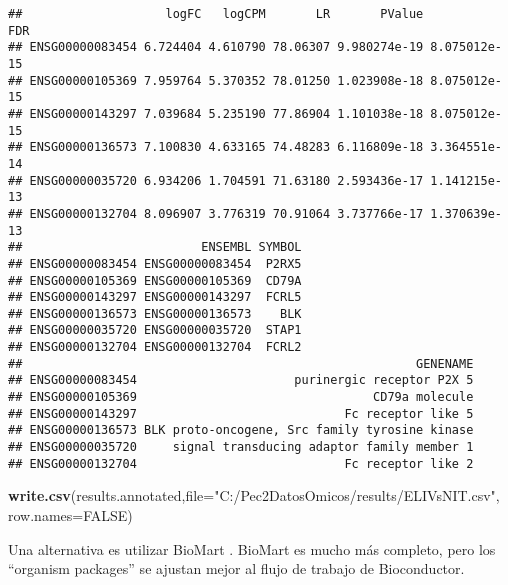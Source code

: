 \documentclass[
]{article}
\newenvironment{Shaded}{\begin{snugshade}}{\end{snugshade}}
\newcommand{\CommentTok}[1]{\textcolor[rgb]{0.56,0.35,0.01}{\textit{#1}}}
\newcommand{\DataTypeTok}[1]{\textcolor[rgb]{0.13,0.29,0.53}{#1}}
\newcommand{\KeywordTok}[1]{\textcolor[rgb]{0.13,0.29,0.53}{\textbf{#1}}}
\newcommand{\NormalTok}[1]{#1}
\newcommand{\OperatorTok}[1]{\textcolor[rgb]{0.81,0.36,0.00}{\textbf{#1}}}
\newcommand{\OtherTok}[1]{\textcolor[rgb]{0.56,0.35,0.01}{#1}}
\newcommand{\StringTok}[1]{\textcolor[rgb]{0.31,0.60,0.02}{#1}}
\begin{document}
\begin{Shaded}
\end{Shaded}

\begin{verbatim}
##                    logFC   logCPM       LR       PValue          FDR
## ENSG00000083454 6.724404 4.610790 78.06307 9.980274e-19 8.075012e-15
## ENSG00000105369 7.959764 5.370352 78.01250 1.023908e-18 8.075012e-15
## ENSG00000143297 7.039684 5.235190 77.86904 1.101038e-18 8.075012e-15
## ENSG00000136573 7.100830 4.633165 74.48283 6.116809e-18 3.364551e-14
## ENSG00000035720 6.934206 1.704591 71.63180 2.593436e-17 1.141215e-13
## ENSG00000132704 8.096907 3.776319 70.91064 3.737766e-17 1.370639e-13
##                         ENSEMBL SYMBOL
## ENSG00000083454 ENSG00000083454  P2RX5
## ENSG00000105369 ENSG00000105369  CD79A
## ENSG00000143297 ENSG00000143297  FCRL5
## ENSG00000136573 ENSG00000136573    BLK
## ENSG00000035720 ENSG00000035720  STAP1
## ENSG00000132704 ENSG00000132704  FCRL2
##                                                       GENENAME
## ENSG00000083454                      purinergic receptor P2X 5
## ENSG00000105369                                 CD79a molecule
## ENSG00000143297                             Fc receptor like 5
## ENSG00000136573 BLK proto-oncogene, Src family tyrosine kinase
## ENSG00000035720     signal transducing adaptor family member 1
## ENSG00000132704                             Fc receptor like 2
\end{verbatim}

\begin{Shaded}
\begin{Highlighting}[]
\KeywordTok{write.csv}\NormalTok{(results.annotated,}\DataTypeTok{file=}\StringTok{"C:/Pec2DatosOmicos/results/ELIVsNIT.csv"}\NormalTok{,}
          \DataTypeTok{row.names=}\OtherTok{FALSE}\NormalTok{)}
\end{Highlighting}
\end{Shaded}

Una alternativa es utilizar BioMart . BioMart es mucho más completo,
pero los ``organism packages'' se ajustan mejor al flujo de trabajo de
Bioconductor.
\end{document}
